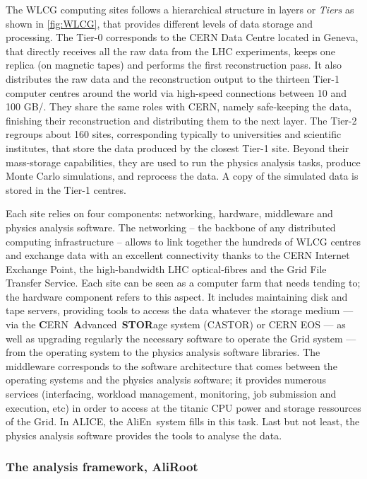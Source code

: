 The WLCG computing sites follows a hierarchical structure in layers or \textit{Tiers} as shown in \fig\ref{fig:WLCG}, that provides different levels of data storage and processing. The Tier-0 corresponds to the CERN Data Centre located in Geneva, that directly receives all the raw data from the LHC experiments, keeps one replica (on magnetic tapes) and performs the first reconstruction pass. It also distributes the raw data and the reconstruction output to the thirteen Tier-1 computer centres around the world via high-speed connections between 10 and 100 GB/\second. They share the same roles with CERN, namely safe-keeping the data, finishing their reconstruction and distributing them to the next layer. The Tier-2 regroups about 160 sites, corresponding typically to universities and scientific institutes, that store the data produced by the closest Tier-1 site. Beyond their mass-storage capabilities, they are used to run the physics analysis tasks, produce Monte Carlo simulations, and reprocess the data. A copy of the simulated data is stored in the Tier-1 centres.

Each site relies on four components: networking, hardware, middleware and physics analysis software. The networking -- the backbone of any distributed computing infrastructure -- allows to link together the hundreds of WLCG centres and exchange data with an excellent connectivity thanks to the CERN Internet Exchange Point, the high-bandwidth LHC optical-fibres and the Grid File Transfer Service. Each site can be seen as a computer farm that needs tending to; the hardware component refers to this aspect. It includes maintaining disk and tape servers, providing tools to access the data whatever the storage medium --- via the \textbf{C}ERN~\textbf{A}dvanced~\textbf{STOR}age system (CASTOR) or CERN EOS --- as well as upgrading regularly the necessary software to operate the Grid system --- from the operating system to the physics analysis software libraries. The middleware corresponds to the software architecture that comes between the operating systems and the physics analysis software; it provides numerous services (interfacing, workload management, monitoring, job submission and execution, etc) in order to access at the titanic CPU power and storage ressources of the Grid. In ALICE, the AliEn~system fills in this task. Last but not least, the physics analysis software provides the tools to analyse the data.


\subsubsection{The analysis framework, AliRoot}
\label{subsubsec:AliRoot}

